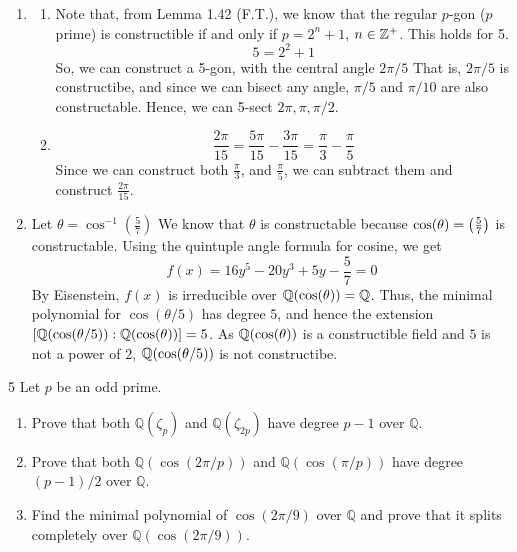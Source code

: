 \documentclass[12pt]{article}
\begin{document}
\begin{solution}
    \bbni
    \begin{enumerate}
        \item 
        \begin{enumerate}
            \item Note that, from Lemma 1.42 (F.T.), we know that the regular $p$-gon ($p$ prime) is constructible if and only if $p=2^n +1$, $n \in \mathbb Z^+$. This holds for 5.
            \[5 = 2^2 + 1\]
            So, we can construct a 5-gon, with the central angle $2\pi/5$
            That is, $2\pi/5$ is constructibe, and since we can bisect any angle, $\pi/5$ and $\pi/10$ are also constructable. 
            Hence, we can 5-sect $2\pi, \pi, \pi/2$. 
            \item \[\frac{2\pi}{15} = \frac{5\pi}{15} - \frac{3\pi}{15} = \frac{\pi}{3} - \frac{\pi}{5}\]
            Since we can construct both $\frac{\pi}{3}$, and $\frac{\pi}{5}$, we can subtract them and construct $\frac{2\pi}{15}$. 
        \end{enumerate}

        \item Let $\theta = \cos^{-1}(\frac{5}{7})$ We know that $\theta$ is constructable because $\cos(\theta) = \left(\frac{5}{7}\right)$ is constructable. 
        Using the quintuple angle formula for cosine, we get
        \[f(x) = 16y^5 - 20y^3 + 5y - \frac{5}{7}= 0 \]
        By Eisenstein, $f(x)$ is irreducible over $\mathbb Q(\cos(\theta)) = \mathbb Q$. Thus, the minimal polynomial for $\cos(\theta/5)$ has degree $5$, and hence the extension $[\mathbb Q(\cos(\theta/5)): \mathbb Q(\cos(\theta))] =5$. As $\mathbb Q(\cos(\theta))$ is a constructible field and $5$ is not a power of $2$, $\mathbb Q(\cos(\theta/5))$ is not constructibe. 
    \end{enumerate}
\end{solution}

\newpage
\begin{problem}{5}
Let $p$ be an odd prime.
    \begin{enumerate}
    \item Prove that both $\mathbb{Q}(\zeta_p)$ and $\mathbb{Q}(\zeta_{2p})$ have degree $p-1$ over $\mathbb{Q}$.
    \item Prove that both $\mathbb{Q}(\cos(2\pi/p))$ and $\mathbb{Q}(\cos(\pi/p))$ have degree $(p-1)/2$ over $\mathbb{Q}$.
    \item Find the minimal polynomial of $\cos(2\pi/9)$ over $\mathbb{Q}$ and prove that it splits completely over $\mathbb{Q}(\cos(2\pi/9))$.
    \end{enumerate}
\end{problem}
\end{document}
